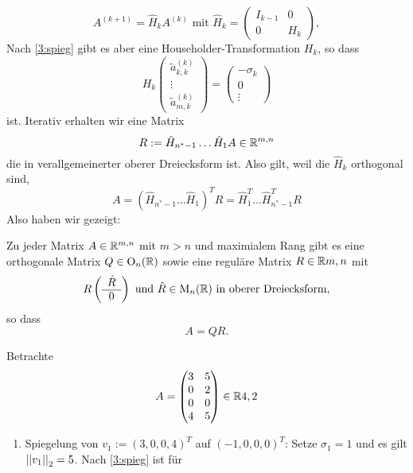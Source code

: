 \[
A^{(k+1)}=\hat{H}_k A^{(k)}\text{ mit }\hat{H}_k = \begin{pmatrix}I_{k-1}&0\\0&H_k\end{pmatrix},
\]
Nach \cref{3:spieg} gibt es aber eine Householder-Transformation $H_k$, so dass
\[
H_k \begin{pmatrix}\tilde{a}_{k,k}^{(k)}\\\vdots\\\tilde{a}^{(k)}_{m,k}\end{pmatrix} = \begin{pmatrix}-\sigma_k\\0\\\vdots\end{pmatrix}
\]
ist.
Iterativ erhalten wir eine Matrix
\[
R:=\hat{H}_{n^{\ast}-1}\hdots \hat{H}_1A\in \mathbb{R}^{m,n}
\]
die in verallgemeinerter oberer Dreiecksform ist. Also gilt, weil die $\hat{H}_k$ orthogonal sind,
\[
A = \left(\hat{H}_{n^{\ast}-1}\hdots \hat{H}_1\right)^TR=\hat{H}_1^T\hdots \hat{H}^T_{n^{\ast}-1}R
\]
Also haben wir gezeigt:
\begin{thm}\label{3:hh}
  Zu jeder Matrix $A\in \mathbb{R}^{m,n}$ mit $m>n$ und maximialem Rang gibt es eine orthogonale Matrix $Q\in \operatorname{O}_{n}(\mathbb{R})$ sowie eine reguläre Matrix $R\in \mathbb{R}{m,n}$ mit
  \[
  R \left(\begin{array}{c}\hat{R}\\\hline 0\end{array}\right)\text{ und }\hat{R}\in \operatorname{M}_n(\mathbb{R}) \text{ in oberer Dreiecksform},
  \]
  so dass
  \[
  A=QR.
  \]
\end{thm}
\begin{bsp}
  Betrachte
  \[
  A = \begin{pmatrix} 3&5\\0&2\\0&0\\4&5\end{pmatrix}\in \mathbb{R}{4,2}
  \]
  \begin{enumerate}
    \item Spiegelung von $v_1:=(3,0,0,4)^T$ auf $(-1,0,0,0)^T$: Setze $\sigma_1 = 1$ und es gilt $\left|\left|v_1\right|\right|_2=5$. Nach \cref{3:spieg} ist für 
  \end{enumerate}
\end{bsp}
\lec
